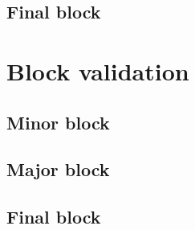 \documentclass[../hydrozoa.tex]{subfiles}
\begin{document}


\subsection{Final block}%
\label{h:l2-block-creation-final}%


\section{Block validation}%
\label{h:l2-block-validation}%


\subsection{Minor block}%
\label{h:l2-block-validation-minor}%


\subsection{Major block}%
\label{h:l2-block-validation-major}%


\subsection{Final block}%
\label{h:l2-block-validation-final}%

\end{document}

